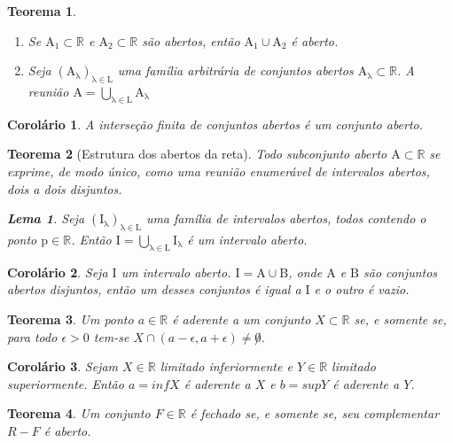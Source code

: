 \documentclass{article}
\theoremstyle{remark}
\theoremstyle{plain}
\newtheorem{theorem}{Teorema}
\theoremstyle{plain}
\newtheorem{corolary}{Corolário}
\theoremstyle{plain}
\newtheorem{lemma}{Lema}
\begin{document}
    \begin{theorem}
        \begin{enumerate}
        \item Se $\mathrm{A_1 \subset \mathbb{R} }$ e $ \mathrm{ A_2 \subset \mathbb{R} }$ são abertos, então $\mathrm{ A_1 \cup A_2 }$ é aberto.
        \item Seja $\mathrm{ \left( A_\lambda \right)_{\lambda \in L} }$ 
            uma família arbitrária de conjuntos abertos $\mathrm{ A_\lambda \subset \mathbb{R} }$.
            A reunião $\mathrm{ A = \bigcup\limits_{\lambda \in L} A_\lambda }$
        \end{enumerate}
    \end{theorem}
    \begin{corolary}
        A interseção finita de conjuntos abertos é um conjunto aberto.
    \end{corolary}
    \begin{theorem}[Estrutura dos abertos da reta]
        Todo subconjunto aberto $\mathrm{A \subset \mathbb{R} }$ se exprime, de modo único, 
        como uma reunião enumerável de intervalos abertos, dois a dois disjuntos. 
        \begin{lemma}
            Seja $\mathrm{ \left( I_\lambda \right)_{\lambda \in L} }$ uma família de intervalos abertos, 
            todos contendo o ponto $\mathrm{p \in \mathbb{R} }$. 
            Então $\mathrm{I = \bigcup\limits_{\lambda \in L} I_\lambda }$ é um intervalo aberto.
        \end{lemma}
    \end{theorem}
    \begin{corolary}
        Seja $\mathrm I$ um intervalo aberto. $\mathrm{ I = A \cup B }$, 
        onde $\mathrm A$ e $\mathrm B$ são conjuntos abertos disjuntos, então um desses conjuntos é igual a $\mathrm I$ e o outro é vazio.
    \end{corolary}
    \begin{theorem}
        Um ponto $a \in \mathbb{R}$ é aderente a um conjunto $X \subset \mathbb{R}$ se, e somente se, 
        para todo $\epsilon > 0 $ tem-se $X \cap ( a-\epsilon, a+ \epsilon ) \neq \not 0$.
    \end{theorem}
    \begin{corolary}
        Sejam $X \in \mathbb{R}$ limitado inferiormente e $Y \in \mathbb{R}$ limitado superiormente. 
        Então $a = inf X$ é aderente a $X$ e $b = sup Y$ é aderente a $Y$.
    \end{corolary}
    \begin{theorem}
        Um conjunto $F \in \mathbb{R}$ é fechado se, e somente se, seu complementar $R-F$ é aberto.
    \end{theorem}
\end{document}
